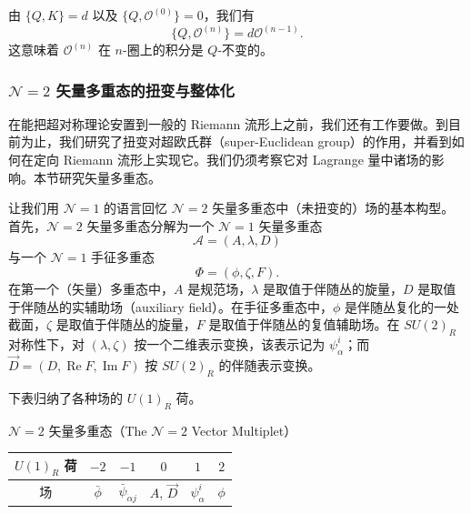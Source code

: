 
由 $\{Q,K\}=d$ 以及 $\{Q,\mathcal{O}^{(0)}\}=0$，我们有
\[
\{Q,\mathcal{O}^{(n)}\}=d\mathcal{O}^{(n-1)}.
\]
这意味着 $\mathcal{O}^{(n)}$ 在 $n$-圈上的积分是 $Q$-不变的。

\subsubsection{$\mathcal{N}=2$ 矢量多重态的扭变与整体化}

在能把超对称理论安置到一般的 Riemann 流形上之前，我们还有工作要做。到目前为止，我们研究了扭变对超欧氏群（super-Euclidean group）的作用，并看到如何在定向 Riemann 流形上实现它。我们仍须考察它对 Lagrange 量中诸场的影响。本节研究矢量多重态。

让我们用 $\mathcal{N}=1$ 的语言回忆 $\mathcal{N}=2$ 矢量多重态中（未扭变的）场的基本构型。首先，$\mathcal{N}=2$ 矢量多重态分解为一个 $\mathcal{N}=1$ 矢量多重态
\[
\mathcal{A}=(A,\lambda,D)
\]
与一个 $\mathcal{N}=1$ 手征多重态
\[
\Phi=(\phi,\zeta,F).
\]
在第一个（矢量）多重态中，$A$ 是规范场，$\lambda$ 是取值于伴随丛的旋量，$D$ 是取值于伴随丛的实辅助场（auxiliary field）。在手征多重态中，$\phi$ 是伴随丛复化的一处截面，$\zeta$ 是取值于伴随丛的旋量，$F$ 是取值于伴随丛的复值辅助场。在 $SU(2)_R$ 对称性下，对 $(\lambda,\zeta)$ 按一个二维表示变换，该表示记为 $\psi^i_\alpha$；而 $\vec D=(D,\operatorname{Re}F,\operatorname{Im}F)$ 按 $SU(2)_R$ 的伴随表示变换。

下表归纳了各种场的 $U(1)_R$ 荷。

\begin{center}
$\mathcal{N}=2$ 矢量多重态（The $\mathcal{N}=2$ Vector Multiplet）\\[4pt]
\begin{tabular}{|c||c|c|c|c|c|}
\hline
$U(1)_R$ 荷 & $-2$ & $-1$ & $0$ & $1$ & $2$\\
\hline
场 & $\bar\phi$ & $\bar\psi_{\dot\alpha j}$ & $A$, $\vec D$ & $\psi^i_\alpha$ & $\phi$\\
\hline
\end{tabular}
\end{center}

